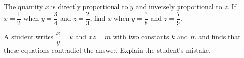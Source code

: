 The quantity $x$ is directly proportional to $y$ and inversely proportional to $z$. If $x=\dfrac{1}{2}$ when $y=\dfrac{3}{4}$ and $z=\dfrac{2}{3}$, find $x$ when $y=\dfrac{7}{8}$ and $z=\dfrac{7}{9}$.

A student writes $\dfrac {x}{y}=k$ and $xz=m$ with two constants $k$ and $m$ and finds that these equations contradict the answer. Explain the student's mistake.
